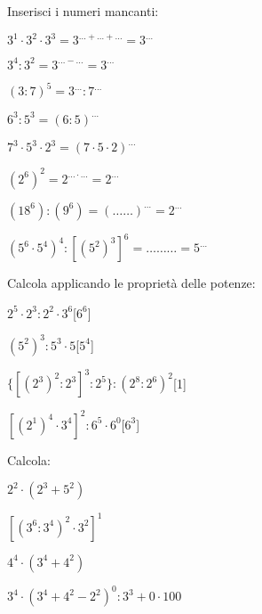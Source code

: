 \begin{esercizio}
\label{ese:1.10}
Inserisci i numeri mancanti:
 \begin{multicols}{2}
 \begin{enumeratea}
 \item \(3^1\cdot3^2\cdot3^3=3^{\ldots+\ldots+\ldots}=3^{\ldots}\)
 \item \(3^4:3^2=3^{\ldots-\ldots}=3^{\ldots}\)
 \item \((3:7)^5=3^{\ldots}:7^{\ldots}\)
 \item \(6^3:5^3=(6:5)^{\ldots}\)
 \item \(7^3\cdot5^3\cdot2^3=(7\cdot 5 \cdot 2)^{\ldots}\)
 \item \((2^6)^2=2^{\ldots\cdot\ldots}=2^{\ldots}\)
 \item \((18^6):(9^6)=(\ldots\ldots)^{\ldots}=2^{\ldots}\)
 \item \((5^6\cdot5^4)^4:[(5^2)^3]^6=\ldots\ldots\ldots=5^{\ldots}\)
 \end{enumeratea}

 \end{multicols}
\end{esercizio}

% 
\begin{esercizio}[\Ast]
\label{ese:1.11}
Calcola applicando le proprietà delle potenze:
 \begin{multicols}{2}
 \begin{enumeratea}
 \item \(2^5\cdot2^3:2^2\cdot3^6\)\hfill[\(6^6\)]
 \item \((5^2)^3:5^3\cdot5\)\hfill[\(5^4\)]
 \item \(\{[(2^3)^2:2^3]^3:2^5\}:(2^8:2^6)^2\)\hfill[1]
 \item \([(2^1)^4\cdot 3^4]^2:6^5\cdot6^0\)\hfill[\(6^3\)]
 \end{enumeratea}
 \end{multicols}
\end{esercizio}

\begin{esercizio}
\label{ese:1.12}
Calcola:
 \begin{multicols}{2}
 \begin{enumeratea}
 \item \(2^2\cdot(2^3+5^2)\)
 \item \([(3^6:3^4)^2\cdot3^2]^1\)
 \item \(4^4\cdot(3^4+4^2)\)
 \item \(3^4\cdot(3^4+4^2-2^2)^0:3^3+0\cdot100\)
 \end{enumeratea}
 \end{multicols}
\end{esercizio}

